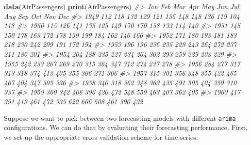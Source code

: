 \documentclass[12pt, krantz2,]{krantz}
\newenvironment{Shaded}{\begin{snugshade}}{\end{snugshade}}
\newcommand{\CommentTok}[1]{\textcolor[rgb]{0.37,0.37,0.37}{\textit{#1}}}
\newcommand{\DataTypeTok}[1]{\textcolor[rgb]{0.27,0.27,0.27}{#1}}
\newcommand{\DecValTok}[1]{\textcolor[rgb]{0.06,0.06,0.06}{#1}}
\newcommand{\KeywordTok}[1]{\textcolor[rgb]{0.27,0.27,0.27}{\textbf{#1}}}
\newcommand{\NormalTok}[1]{#1}
\newcommand{\StringTok}[1]{\textcolor[rgb]{0.5,0.5,0.5}{#1}}
\theoremstyle{definition}
\theoremstyle{definition}
\theoremstyle{definition}
\newcommand{\1}{\mathbbm{1}}
\begin{document}
\begin{Shaded}
\begin{Highlighting}[]
\KeywordTok{data}\NormalTok{(AirPassengers)}
\KeywordTok{print}\NormalTok{(AirPassengers)}
\CommentTok{#>      Jan Feb Mar Apr May Jun Jul Aug Sep Oct Nov Dec}
\CommentTok{#> 1949 112 118 132 129 121 135 148 148 136 119 104 118}
\CommentTok{#> 1950 115 126 141 135 125 149 170 170 158 133 114 140}
\CommentTok{#> 1951 145 150 178 163 172 178 199 199 184 162 146 166}
\CommentTok{#> 1952 171 180 193 181 183 218 230 242 209 191 172 194}
\CommentTok{#> 1953 196 196 236 235 229 243 264 272 237 211 180 201}
\CommentTok{#> 1954 204 188 235 227 234 264 302 293 259 229 203 229}
\CommentTok{#> 1955 242 233 267 269 270 315 364 347 312 274 237 278}
\CommentTok{#> 1956 284 277 317 313 318 374 413 405 355 306 271 306}
\CommentTok{#> 1957 315 301 356 348 355 422 465 467 404 347 305 336}
\CommentTok{#> 1958 340 318 362 348 363 435 491 505 404 359 310 337}
\CommentTok{#> 1959 360 342 406 396 420 472 548 559 463 407 362 405}
\CommentTok{#> 1960 417 391 419 461 472 535 622 606 508 461 390 432}
\end{Highlighting}
\end{Shaded}

Suppose we want to pick between two forecasting models with different \texttt{arima}
configurations. We can do that by evaluating their forecasting performance.
First, we set up the appropriate cross-validation scheme for time-series.

\begin{Shaded}
\end{Shaded}
\end{document}
